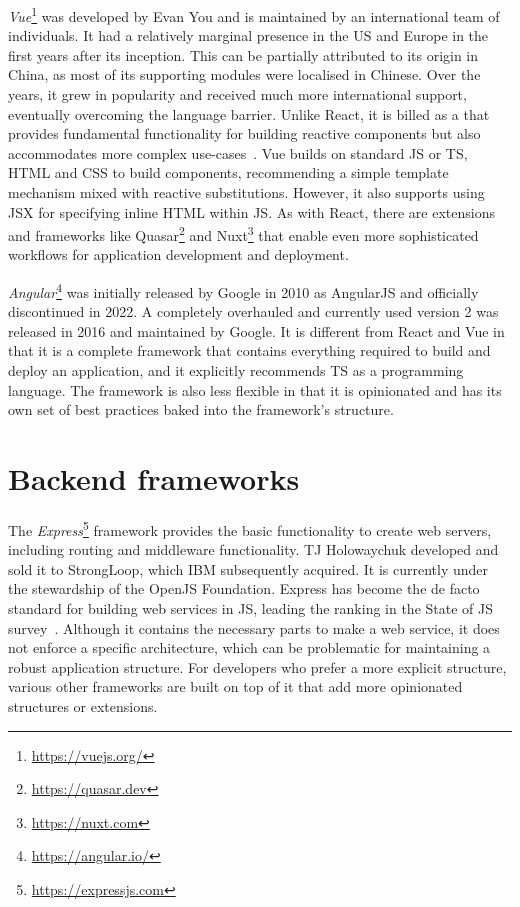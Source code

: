 \emph{Vue}\footnote{\url{https://vuejs.org/}} was developed by Evan You and is maintained by an international team of individuals.
It had a relatively marginal presence in the US and Europe in the first years after its inception.
This can be partially attributed to its origin in China, as most of its supporting modules were localised in Chinese.
Over the years, it grew in popularity and received much more international support, eventually overcoming the language barrier.
Unlike React, it is billed as a  that provides fundamental functionality for building reactive components but also accommodates more complex use-cases~\parencite{vueProgressiveFramework}.
Vue builds on standard \ac{JS} or \ac{TS}, \ac{HTML} and \ac{CSS} to build components, recommending a simple template mechanism mixed with reactive substitutions.
However, it also supports using \ac{JSX} for specifying inline \ac{HTML} within \ac{JS}.
As with React, there are extensions and frameworks like Quasar\footnote{\url{https://quasar.dev}} and Nuxt\footnote{\url{https://nuxt.com}} that enable even more sophisticated workflows for application development and deployment.

\emph{Angular}\footnote{\url{https://angular.io/}} was initially released by Google in 2010 as AngularJS and officially discontinued in 2022.
A completely overhauled and currently used version 2 was released in 2016 and maintained by Google.
It is different from React and Vue in that it is a complete framework that contains everything required to build and deploy an application, and it explicitly recommends \ac{TS} as a programming language.
The framework is also less flexible in that it is opinionated and has its own set of best practices baked into the framework's structure.




\section{Backend frameworks}
\label{sec:backend-frameworks}

The \emph{Express}\footnote{\url{https://expressjs.com}} framework provides the basic functionality to create web servers, including routing and middleware functionality.
TJ Holowaychuk developed and sold it to StrongLoop, which IBM subsequently acquired.
It is currently under the stewardship of the OpenJS Foundation.
Express has become the de facto standard for building web services in JS, leading the ranking in the State of JS survey~\parencite{mostUsedBackendFrameworks22}.
Although it contains the necessary parts to make a web service, it does not enforce a specific architecture, which can be problematic for maintaining a robust application structure.
For developers who prefer a more explicit structure, various other frameworks are built on top of it that add more opinionated structures or extensions.

